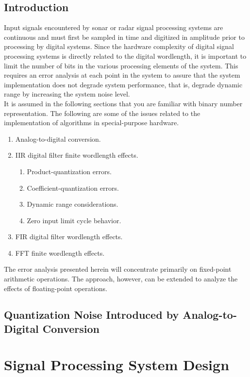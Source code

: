 \documentclass[11pt]{book}
\theoremstyle{example}
\begin{document}
\section{Introduction}
Input signals encountered by sonar or radar signal  processing systems are continuous and must first be sampled in time and digitized in amplitude prior to processing by digital systems. Since the hardware complexity of digital signal processing systems is directly related to the digital wordlength, it is important to limit the number of bits in the various processing elements of the system. This requires an error analysis at each point in the system to assure that the system implementation does not degrade system performance, that is, degrade dynamic range by increasing the system noise level.\\
It is assumed in the following sections that you are familiar with binary number representation. The following are some of the issues related to the implementation of algorithms in special-purpose hardware.
\begin{enumerate}
	\item Analog-to-digital conversion.
	\item IIR digital filter finite wordlength effects.
	\begin{enumerate}
		\item Product-quantization errors.
		\item Coefficient-quantization errors.
		\item Dynamic range considerations.
		\item Zero input limit cycle behavior.
	\end{enumerate}
	\item FIR digital filter wordlength effects.
	\item FFT finite wordlength effects.
\end{enumerate}
The error analysis presented herein will concentrate primarily on fixed-point arithmetic operations. The approach, however, can be extended to analyze the effects of floating-point operations.

\section{Quantization Noise Introduced by Analog-to-Digital Conversion}

\chapter{Signal Processing System Design}
\end{document}

